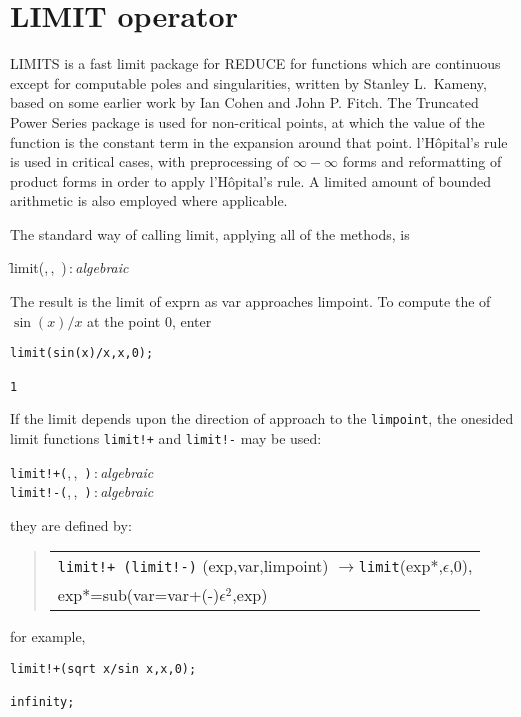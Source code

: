 \section{LIMIT operator}

LIMITS is a fast limit package for REDUCE for functions which are
continuous except for computable poles and singularities, written by Stanley L.~Kameny, based on some
earlier work by Ian Cohen and John P. Fitch.  The Truncated Power Series
package is used for non-critical points, at which the value of the
function is the constant term in the expansion around that point.
l'H\^opital's rule is used in critical cases, with preprocessing of
$\infty - \infty$ forms and reformatting of product forms in order
to apply l'H\^opital's rule.  A limited amount of bounded arithmetic
is also employed where applicable.

The standard way of calling limit, applying all of the methods, is
\hypertarget{operator:LIMIT}{}
\begin{syntax}
  \f{limit(},\,,\,%
    )\,:\,\textit{algebraic}
\end{syntax}
The result is the limit of exprn as var approaches limpoint.
To compute the of \(\sin(x)/x\) at the point $0$, enter
\begin{verbatim}
limit(sin(x)/x,x,0);

1
\end{verbatim}
If the limit depends upon the direction of approach to the \texttt{limpoint},                                                                                                        the onesided limit functions \texttt{limit!+} and \texttt{limit!-} may be used:
\hypertarget{operator:LIMIT+}{}
\hypertarget{operator:LIMIT-}{}
\begin{syntaxtable}
  \texttt{limit!+(},\,,\,%
    \texttt{)}\,:\,\textit{algebraic} \\
  \texttt{limit!-(},\,,\,%
    \texttt{)}\,:\,\textit{algebraic}
\end{syntaxtable}
they are defined by:
\begin{quote}
\begin{tabular}{l}
 \texttt{limit!+ (limit!-)} (exp,var,limpoint) $\rightarrow$\texttt{limit}(exp*,$\epsilon$,0), \\
  \qquad exp*=sub(var=var+(-)$\epsilon^2$,exp)
\end{tabular}
\end{quote}
for example,
\begin{verbatim}
limit!+(sqrt x/sin x,x,0);

infinity;
\end{verbatim}


